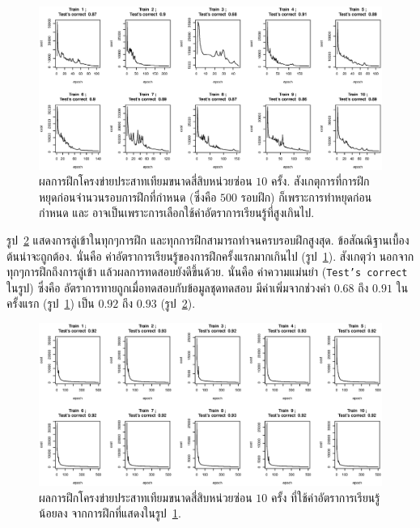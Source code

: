 %
\begin{figure}
\begin{center}
\includegraphics[width=5.5in]{04ANNAppImg/m40trainCost.eps}
\end{center}
\caption{ผลการฝึกโครงข่ายประสาทเทียมขนาดสี่สิบหน่วยซ่อน $10$ ครั้ง. 
สังเกตุการที่การฝึกหยุดก่อนจำนวนรอบการฝึกที่กำหนด (ซึ่งคือ $500$ รอบฝึก) ก็เพราะการทำหยุดก่อนกำหนด 
และ อาจเป็นเพราะการเลือกใช้ค่าอัตราการเรียนรู้ที่สูงเกินไป.}
\label{fig: ann zip m 40 high rhos}
\end{figure}
%

รูป~\ref{fig: ann zip m 40 good rhos} แสดงการลู่เข้าในทุกๆการฝึก และทุกการฝึกสามารถทำจนครบรอบฝึกสูงสุด.
ข้อสัณณิฐานเบื้องต้นน่าจะถูกต้อง.
นั่นคือ ค่าอัตราการเรียนรู้ของการฝึกครั้งแรกมากเกินไป (รูป~\ref{fig: ann zip m 40 high rhos}).
สังเกตุว่า นอกจากทุกๆการฝึกถึงการลู่เข้า แล้วผลการทดสอบยังดีขึ้นด้วย.
นั่นคือ ค่าความแม่นยำ (\texttt{Test's correct} ในรูป) ซึ่งคือ อัตราการทายถูกเมื่อทดสอบกับข้อมูลชุดทดสอบ มีค่าเพิ่มจากช่วงค่า $0.68$ ถึง $0.91$ ในครั้งแรก (รูป~\ref{fig: ann zip m 40 high rhos}) เป็น $0.92$ ถึง $0.93$ (รูป~\ref{fig: ann zip m 40 good rhos}).

%
\begin{figure}
\begin{center}
\includegraphics[width=5.5in]{04ANNAppImg/m40trainCostLowRho.eps}
\end{center}
\caption{ผลการฝึกโครงข่ายประสาทเทียมขนาดสี่สิบหน่วยซ่อน $10$ ครั้ง ที่ใช้ค่าอัตราการเรียนรู้น้อยลง จากการฝึกที่แสดงในรูป~\ref{fig: ann zip m 40 high rhos}.}
\label{fig: ann zip m 40 good rhos}
\end{figure}
%

